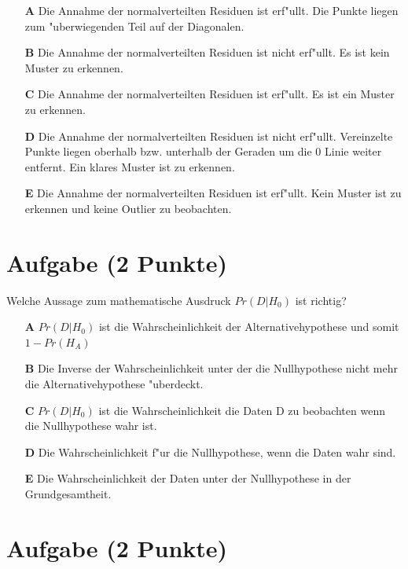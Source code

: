 \documentclass[a4paper, 9pt]{scrartcl}\usepackage[]{graphicx}\usepackage[]{xcolor}
\begin{document}
\begin{enumerate}
\item [\textbf{A} \msquare] Die Annahme der normalverteilten Residuen ist erf{"u}llt. Die Punkte liegen zum {"u}berwiegenden Teil auf der Diagonalen.
\item [\textbf{B} \msquare] Die Annahme der normalverteilten Residuen ist nicht erf{"u}llt. Es ist kein Muster zu erkennen.
\item [\textbf{C} \msquare] Die Annahme der normalverteilten Residuen ist erf{"u}llt. Es ist ein Muster zu erkennen.
\item [\textbf{D} \msquare] Die Annahme der normalverteilten Residuen ist nicht erf{"u}llt. Vereinzelte Punkte liegen oberhalb bzw. unterhalb der Geraden um die 0 Linie weiter entfernt. Ein klares Muster ist zu erkennen.
\item [\textbf{E} \msquare] Die Annahme der normalverteilten Residuen ist erf{"u}llt. Kein Muster ist zu erkennen und keine Outlier zu beobachten.
\end{enumerate}

\section{Aufgabe \hfill (2 Punkte)}

Welche Aussage zum mathematische Ausdruck $Pr(D|H_0)$ ist richtig? 



\begin{enumerate}
\item [\textbf{A} \msquare] $Pr(D|H_0)$ ist die Wahrscheinlichkeit der Alternativehypothese und somit $1 - Pr(H_A)$
\item [\textbf{B} \msquare] Die Inverse der Wahrscheinlichkeit unter der die Nullhypothese nicht mehr die Alternativehypothese {"u}berdeckt.
\item [\textbf{C} \msquare] $Pr(D|H_0)$ ist die Wahrscheinlichkeit die Daten D zu beobachten wenn die Nullhypothese wahr ist.
\item [\textbf{D} \msquare] Die Wahrscheinlichkeit f{"u}r die Nullhypothese, wenn die Daten wahr sind.
\item [\textbf{E} \msquare] Die Wahrscheinlichkeit der Daten unter der Nullhypothese in der Grundgesamtheit.
\end{enumerate}

\section{Aufgabe \hfill (2 Punkte)}
\end{document}
